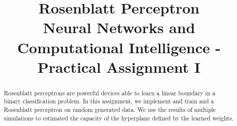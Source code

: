 \documentclass[conference]{IEEEtran}
\begin{document}
\title{
    Rosenblatt Perceptron\\
    \large Neural Networks and Computational Intelligence - Practical Assignment I
}

\author{
    \and
}

\maketitle

\begin{abstract}
    Rosenblatt perceptrons are powerful devices able to learn a linear boundary in a binary classification problem.
    In this assignment, we implement and train and a Rosenblatt perceptron on random generated data.
    We use the results of multiple simulations to estimated the capacity of the hyperplane defined by the learned weights.
\end{abstract}

\acresetall










\end{document}
